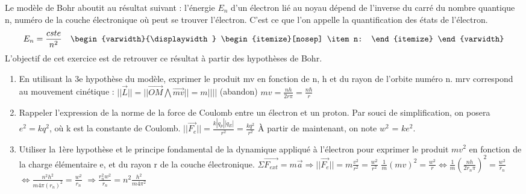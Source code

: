 \documentclass{article}
\begin{document}
Le modèle de Bohr aboutit au résultat suivant : l’énergie $E_{n}$ d’un électron lié au noyau dépend de l’inverse du carré du nombre quantique n, numéro de la couche électronique où peut se trouver l’électron. C’est ce que l’on appelle la quantification des états de l’électron.
\[
    E_{n} = \frac{cste}{n^{2}}
    \quad
    \begin{varwidth}{\displaywidth}
        \begin{itemize}[nosep]
            \item n:
        \end{itemize}
    \end{varwidth}
\]
L’objectif de cet exercice est de retrouver ce résultat à partir des hypothèses de Bohr.
\begin{enumerate}
    \item En utilisant la 3e hypothèse du modèle, exprimer le produit mv en fonction de n, h et du rayon de l’orbite numéro n.\newline
    mrv correspond au mouvement cinétique : $||\overrightarrow{L}|| = ||\overrightarrow{OM}\bigwedge\overrightarrow{mv}|| = m|||| $ (abandon)\newline
    $mv = \frac{nh}{2r\pi} = \frac{n\hbar}{r}$
    \item Rappeler l’expression de la norme de la force de Coulomb entre un électron et un proton.
    Par souci de simplification, on posera $e^{2}=kq^{2}$, où k est la constante de Coulomb.\newline
    $||\overrightarrow{F_{e}}|| = \frac{k|q_{p}||q_{E}|}{r^{2}} = \frac{kq^{2}}{r^{2}}$\newline
    À partir de maintenant, on note $w^{2}$ = $ke^{2}$.\newline
    \item Utiliser la 1ère hypothèse et le principe fondamental de la dynamique appliqué à l’électron pour exprimer le produit $mv^{2}$ en fonction de la charge élémentaire e, et du rayon r de la couche électronique.\newline
    $\Sigma \overrightarrow{F_{ext}} = m\overrightarrow{a} \Longrightarrow ||\overrightarrow{F_{e}}|| = m\frac{v^{2}}{r^{2}} = \frac{w^{2}}{r^{2}}$\newline
    $\frac{1}{m}(mv)^{2} = \frac{w^{2}}{r} \Longleftrightarrow \frac{1}{m}(\frac{nh}{2r_{n}\pi})^{2} = \frac{w^{2}}{r_{n}}$\newline
    $\Longleftrightarrow \frac{n^{2}h^{2}}{m4\pi (r_{n})^{2}} = \frac{w^{2}}{r_{n}}$\newline
    $\Longrightarrow \frac{r_{n}^{2}w^{2}}{r_{n}} = n^{2}\frac{h^{2}}{m4\pi^{2}}$\newline

\end{enumerate}
\end{document}
